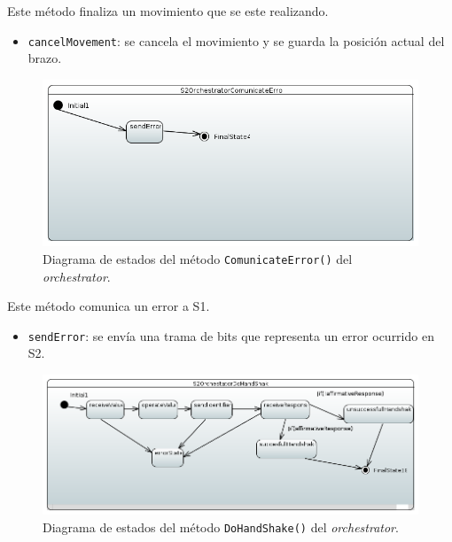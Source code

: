 Este método finaliza un movimiento que se este realizando.

\begin{itemize}
    \item \texttt{cancelMovement}: se cancela el movimiento y se guarda la posición actual del brazo.
\end{itemize}

\begin{figure}[H]
    \centering
    \includegraphics[width=1\linewidth]{pictures/S2OrchestratorComunicateError.PNG}
    \caption{Diagrama de estados del método \texttt{ComunicateError()} del \textit{orchestrator}.}
    \label{fig:fun_comunicate_error_orchestrator}
\end{figure}

Este método comunica un error a \ac{S1}.

\begin{itemize}
    \item \texttt{sendError}: se envía una trama de bits que representa un error ocurrido en \ac{S2}.
\end{itemize}

\begin{figure}[H]
    \centering
    \includegraphics[width=1\linewidth]{pictures/S2OrchestratorDoHandShake.PNG}
    \caption{Diagrama de estados del método \texttt{DoHandShake()} del \textit{orchestrator}.}
    \label{fig:fun_do_hand_shake_orchestrator}
\end{figure}

